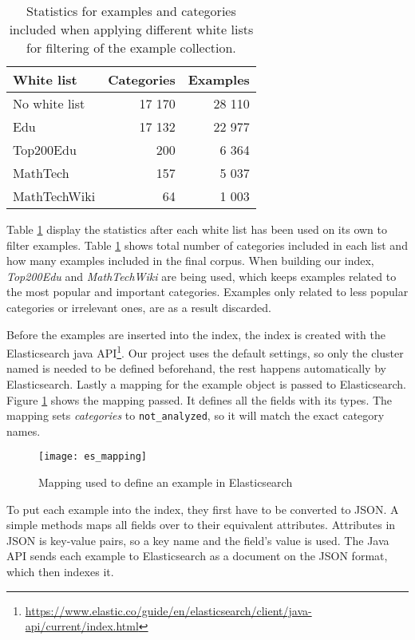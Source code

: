 \begin{table}[h!]
\centering
\begin{tabular} {|| p{10em} | r | r||} 
 \hline
  White list & Categories & Examples \\ [0.5ex] 
 \hline
No white list & 17 170 & 28 110 \\
Edu & 17 132 & 22 977 \\
Top200Edu & 200 & 6 364 \\
MathTech & 157 & 5 037 \\
MathTechWiki & 64 & 1 003 \\

 \hline
\end{tabular}
\caption{Statistics for examples and categories included when applying different white lists for filtering of the example collection.}
\label{table:whitelist_stats}
\end{table}

Table \ref{table:whitelist_stats} display the statistics after each white list has been used on its own to filter examples. Table \ref{table:whitelist_stats} shows total number of categories included in each list and how many examples included in the final corpus.
When building our index, \textit{Top200Edu} and \textit{MathTechWiki} are being used, which keeps examples related to the most popular and important categories. Examples only related to less popular categories or irrelevant ones, are as a result discarded.


Before the examples are inserted into the index, the index is created with the Elasticsearch java API\footnote{\url{https://www.elastic.co/guide/en/elasticsearch/client/java-api/current/index.html}}. Our project uses the default settings, so only the cluster named is needed to be defined beforehand, the rest happens automatically by Elasticsearch. Lastly a mapping for the example object is passed to Elasticsearch. Figure \ref{fig:es_mapping} shows the mapping passed. It defines all the fields with its types. The mapping sets \textit{categories} to \texttt{not\_analyzed}, so it will match the exact category names.

\begin{figure}[H] 
\caption{Mapping used to define an example in Elasticsearch}
\centering
\texttt{[image: es\_mapping]}
\label{fig:es_mapping}
\end{figure}

To put each example into the index, they first have to be converted to JSON. A simple methods maps all fields over to their equivalent attributes. Attributes in JSON is key-value pairs, so a key name and the field's value is used. The Java API sends each example to Elasticsearch as a document on the JSON format, which then indexes it.

